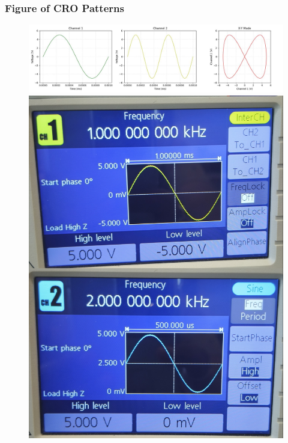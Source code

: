 \documentclass[12pt,a4paper]{report}
\begin{document}
\subsubsection*{Figure of CRO Patterns}
\begin{figure}[H] %
    \centering
    \includegraphics[width=\textwidth]{figs/3.jpg} %
    \begin{minipage}[c]{0.48\textwidth}
        \includegraphics[width=\textwidth]{figs/3read.jpg} %
        

\end{minipage}
\end{figure}
\end{document}
